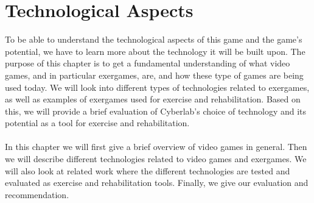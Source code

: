 \chapter{Technological Aspects}
To be able to understand the technological aspects of this game and the game's potential, we have to learn more about the technology it will be built upon.  The purpose of this chapter is to get a fundamental understanding of what video games, and in particular exergames, are, and how these type of games are being used today. We will look into different types of technologies related to exergames, as well as examples of exergames used for exercise and rehabilitation. Based on this, we will provide a brief evaluation of Cyberlab's choice of technology and its potential as a tool for exercise and rehabilitation.  \\ \\ 
In this chapter we will first give a brief overview of video games in general. Then we will describe different technologies related to video games and exergames. We will also look at related work where the different technologies are tested and evaluated as exercise and rehabilitation tools. Finally, we give our evaluation and recommendation.\\ \\

